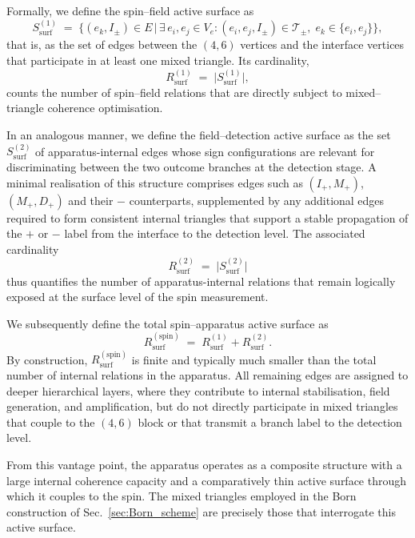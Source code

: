 \documentclass[11pt,a4paper]{article}
\numberwithin{equation}{section}
\begin{document}
Formally, we define the spin–field active surface as
\begin{equation}
  S_{\mathrm{surf}}^{(1)} \;=\;
  \big\{ (e_k,I_\pm) \in E \,\big|\,
    \exists\, e_i,e_j\in V_e : (e_i,e_j,I_\pm)\in\mathcal{T}_\pm,\;
    e_k\in\{e_i,e_j\}
  \big\},
\end{equation}
that is, as the set of edges between the $(4,6)$ vertices and the interface vertices that participate in at least one mixed triangle. Its cardinality,
\begin{equation}
  R_{\mathrm{surf}}^{(1)} \;=\; \big| S_{\mathrm{surf}}^{(1)} \big|,
\end{equation}
counts the number of spin–field relations that are directly subject to mixed–triangle coherence optimisation.

In an analogous manner, we define the field–detection active surface as the set $S_{\mathrm{surf}}^{(2)}$ of apparatus-internal edges whose sign configurations are relevant for discriminating between the two outcome branches at the detection stage. A minimal realisation of this structure comprises edges such as $(I_+,M_+)$, $(M_+,D_+)$ and their $-$ counterparts, supplemented by any additional edges required to form consistent internal triangles that support a stable propagation of the $+$ or $-$ label from the interface to the detection level. The associated cardinality
\begin{equation}
  R_{\mathrm{surf}}^{(2)} \;=\; \big| S_{\mathrm{surf}}^{(2)} \big|
\end{equation}
thus quantifies the number of apparatus-internal relations that remain logically exposed at the surface level of the spin measurement.

We subsequently define the total spin–apparatus active surface as
\begin{equation}
  R_{\mathrm{surf}}^{(\mathrm{spin})}
  \;=\;
  R_{\mathrm{surf}}^{(1)} + R_{\mathrm{surf}}^{(2)}.
  \label{eq:Rsurf_spin_def}
\end{equation}
By construction, $R_{\mathrm{surf}}^{(\mathrm{spin})}$ is finite and typically much smaller than the total number of internal relations in the apparatus. All remaining edges are assigned to deeper hierarchical layers, where they contribute to internal stabilisation, field generation, and amplification, but do not directly participate in mixed triangles that couple to the $(4,6)$ block or that transmit a branch label to the detection level.

From this vantage point, the apparatus operates as a composite structure with a large internal coherence capacity and a comparatively thin active surface through which it couples to the spin. The mixed triangles employed in the Born construction of Sec.~\ref{sec:Born_scheme} are precisely those that interrogate this active surface.
\end{document}
